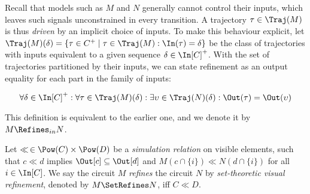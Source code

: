 Recall that models such as $M$ and $N$ generally cannot control their inputs, which leaves such signals unconstrained in every transition. A trajectory $\tau \in \Traj(M)$ is thus \textit{driven} by an implicit choice of inputs. To make this behaviour explicit, let $\Traj(M)(\delta) = \{ \tau \in C^{+} \mid \tau \in \Traj(M) : \In(\tau) = \delta \}$ be the class of trajectories with inputs equivalent to a given sequence $\delta \in \In[C]^{+}$. With the set of trajectories partitioned by their inputs, we can state refinement as an output equality for each part in the family of inputs:


\begin{equation*}
\forall \delta \in \In[C]^{+} : \forall \tau \in \Traj(M)(\delta) : \exists \upsilon \in \Traj(N)(\delta) : \Out(\tau) = \Out(\upsilon)
\end{equation*}

\noindent This definition is equivalent to the earlier one, and we denote it by $M \Refines_{in} N$. 




 Let $\ll \, \in \Pow(C) \times \Pow(D)$ be a \textit{simulation relation} on visible elements, such that $c \ll d$ implies $\Out[c] \subseteq \Out[d]$ and $M(c \cap \{ i \}) \ll N(d \cap \{ i \})$ for all $i \in \In[C]$. We say the circuit $M$ \textit{refines} the circuit $N$ by \textit{set-theoretic visual refinement}, denoted by $M \SetRefines N$, iff $C \ll D$.

